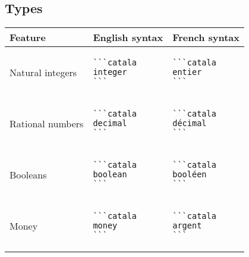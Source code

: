 \documentclass[a3paper,landscape]{article}
\begin{document}
\begin{multicols*}{2}
\section*{Types}
\begin{center}
\begin{tabular}{p{}p{}p{}}
\toprule
Feature&English syntax&French syntax\\\midrule
Natural integers&
\vspace*{-1.75em}
\begin{verbatim}
```catala
integer
```
\end{verbatim}
\vspace*{-1.75em}
&
\vspace*{-1.75em}
\begin{verbatim}
```catala
entier
```
\end{verbatim}
\vspace*{-1.75em}
\\
Rational numbers&
\vspace*{-1.75em}
\begin{verbatim}
```catala
decimal
```
\end{verbatim}
\vspace*{-1.75em}
&
\vspace*{-1.75em}
\begin{verbatim}
```catala
décimal
```
\end{verbatim}
\vspace*{-1.75em}
\\
Booleans&
\vspace*{-1.75em}
\begin{verbatim}
```catala
boolean
```
\end{verbatim}
\vspace*{-1.75em}
&
\vspace*{-1.75em}
\begin{verbatim}
```catala
booléen
```
\end{verbatim}
\vspace*{-1.75em}
\\
Money&
\vspace*{-1.75em}
\begin{verbatim}
```catala
money
```
\end{verbatim}
\vspace*{-1.75em}
&
\vspace*{-1.75em}
\begin{verbatim}
```catala
argent
```
\end{verbatim}

\end{tabular}
\end{center}
\end{multicols*}
\end{document}
